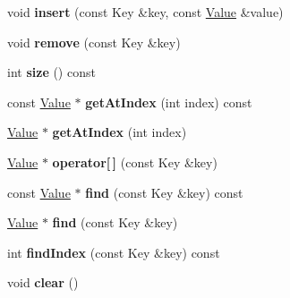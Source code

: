 \begin{DoxyCompactItemize}
\item 
\hypertarget{classbt_hash_map_a15fc118df433a9b7f4350d42cd33bd13}{void {\bfseries insert} (const Key \&key, const \hyperlink{union_value}{Value} \&value)}\label{classbt_hash_map_a15fc118df433a9b7f4350d42cd33bd13}

\item 
\hypertarget{classbt_hash_map_aa42f8bdb95f77c52974d9998b41e0507}{void {\bfseries remove} (const Key \&key)}\label{classbt_hash_map_aa42f8bdb95f77c52974d9998b41e0507}

\item 
\hypertarget{classbt_hash_map_ac45fa2d9a1ddd65e119c5e102524fda4}{int {\bfseries size} () const }\label{classbt_hash_map_ac45fa2d9a1ddd65e119c5e102524fda4}

\item 
\hypertarget{classbt_hash_map_ad1652cb7b4807c2990f2f1938e207b2f}{const \hyperlink{union_value}{Value} $\ast$ {\bfseries get\+At\+Index} (int index) const }\label{classbt_hash_map_ad1652cb7b4807c2990f2f1938e207b2f}

\item 
\hypertarget{classbt_hash_map_a6a80cb0e97a1f5493877c78ceea058c2}{\hyperlink{union_value}{Value} $\ast$ {\bfseries get\+At\+Index} (int index)}\label{classbt_hash_map_a6a80cb0e97a1f5493877c78ceea058c2}

\item 
\hypertarget{classbt_hash_map_af195fa3847a1159b3dc161f32fd09004}{\hyperlink{union_value}{Value} $\ast$ {\bfseries operator\mbox{[}$\,$\mbox{]}} (const Key \&key)}\label{classbt_hash_map_af195fa3847a1159b3dc161f32fd09004}

\item 
\hypertarget{classbt_hash_map_ab04b49625760144b1e8a66dc8b7bf6b9}{const \hyperlink{union_value}{Value} $\ast$ {\bfseries find} (const Key \&key) const }\label{classbt_hash_map_ab04b49625760144b1e8a66dc8b7bf6b9}

\item 
\hypertarget{classbt_hash_map_afe51e217996a94c176e59208b78ad90a}{\hyperlink{union_value}{Value} $\ast$ {\bfseries find} (const Key \&key)}\label{classbt_hash_map_afe51e217996a94c176e59208b78ad90a}

\item 
\hypertarget{classbt_hash_map_ac636345574da8fc308e6ecabbf428501}{int {\bfseries find\+Index} (const Key \&key) const }\label{classbt_hash_map_ac636345574da8fc308e6ecabbf428501}

\item 
\hypertarget{classbt_hash_map_a350c623ef89a0c7e8b542537f8d0c9f0}{void {\bfseries clear} ()}\label{classbt_hash_map_a350c623ef89a0c7e8b542537f8d0c9f0}

\end{DoxyCompactItemize}
